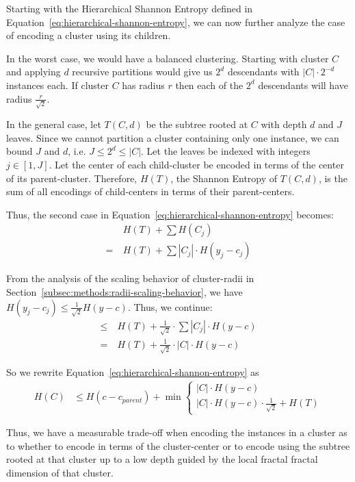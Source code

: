 Starting with the Hierarchical Shannon Entropy defined in Equation~\ref{eq:hierarchical-shannon-entropy}, we can now further analyze the case of encoding a cluster using its children.

In the worst case, we would have a balanced clustering.
Starting with cluster $C$ and applying $d$ recursive partitions would give us $2^d$ descendants with $|C| \cdot 2^{-d}$ instances each.
If cluster $C$ has radius $r$ then each of the $2^d$ descendants will have radius $\frac{r}{\sqrt{2}}$.

In the general case, let $T(C, d)$ be the subtree rooted at $C$ with depth $d$ and $J$ leaves.
Since we cannot partition a cluster containing only one instance, we can bound $J$ and $d$, i.e. $J \leq 2^d \leq |C|$.
Let the leaves be indexed with integers $j \in [1, J]$.
Let the center of each child-cluster be encoded in terms of the center of its parent-cluster.
Therefore, $H(T)$, the Shannon Entropy of $T(C, d)$, is the sum of all encodings of child-centers in terms of their parent-centers.

Thus, the second case in Equation~\ref{eq:hierarchical-shannon-entropy} becomes:
\begin{align*}
    & H(T) + \sum H(C_j) \\
    = \ & H(T) + \sum |C_j| \cdot H(y_j - c_j)
\end{align*}

From the analysis of the scaling behavior of cluster-radii in Section~\ref{subsec:methods:radii-scaling-behavior}, we have $H(y_j - c_j) \leq \frac{1}{\sqrt{2}} H(y - c)$.
Thus, we continue:
\begin{align*}
    \leq \ & H(T) + \frac{1}{\sqrt{2}} \cdot \sum |C_j| \cdot H(y - c) \\
    = \ & H(T) + \frac{1}{\sqrt{2}} \cdot |C| \cdot H(y - c)
\end{align*}

So we rewrite Equation~\ref{eq:hierarchical-shannon-entropy} as
\begin{align}
    \label{eq:hierarchical-shannon-entropy-2}
    H(C) &\leq H(c - c_{parent}) + \min \begin{cases}
        |C| \cdot H(y - c) \\
        |C| \cdot H(y - c) \cdot \frac{1}{\sqrt{2}} + H(T)
    \end{cases}
\end{align}

Thus, we have a measurable trade-off when encoding the instances in a cluster as to whether to encode in terms of the cluster-center or to encode using the subtree rooted at that cluster up to a low depth guided by the local fractal fractal dimension of that cluster.

